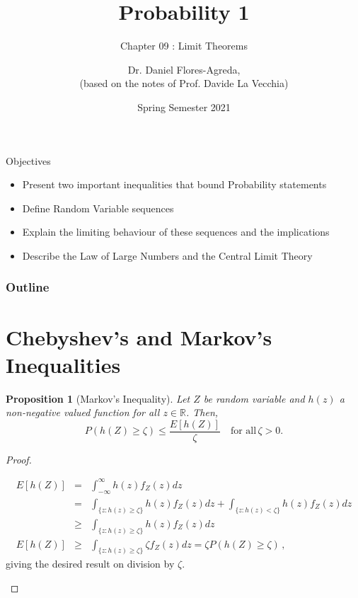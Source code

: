 \documentclass[notes=show,smaller,handout]{beamer}\usepackage[]{graphicx}\usepackage[]{color}
\newtheorem{proposition}{Proposition}[section]
\renewcommand{\Pr}{P}
\begin{document}
\title[S110015]{Probability 1}
\subtitle{Chapter 09 : Limit Theorems}
\author[Flores-Agreda, La Vecchia]{Dr. Daniel Flores-Agreda, \\[0.5em] \tiny{(based on the notes of Prof. Davide La Vecchia)}}
\date{Spring Semester 2021}

\begin{frame}
  \titlepage
\end{frame}


\begin{frame}{Objectives}
  \begin{itemize}
  \item Present two important inequalities that bound Probability statements\bigskip
  \item Define Random Variable sequences \bigskip
  \item Explain the limiting behaviour of these sequences and the implications \bigskip
  \item Describe the Law of Large Numbers and the Central Limit Theory\bigskip
  \end{itemize}
\end{frame}

\begin{frame}{\secname}
  \frametitle{Outline}
  \tableofcontents
\end{frame}


\section{Chebyshev's and Markov's Inequalities}

\begin{frame}{\secname}
  \begin{proposition}[Markov's Inequality]
  Let $Z$ be random variable and $h(z)$ a non-negative valued function for all $z\in \mathbb{R}$. Then,
    \begin{equation}
    \Pr(h(Z)\geq \zeta)\leq \frac{E[h(Z)]}{\zeta}\quad\text{for all}\,\zeta>0. \label{Eq. M1}
    \end{equation}
  \end{proposition}
  \pause
  \begin{proof}
  \begin{footnotesize}
  \begin{eqnarray*}
  E[h( Z)]&=&\int_{-\infty }^{\infty }h(z) f_{Z}\left(z\right)dz\\
  &=&\int_{\{z:h(z)\geq\zeta\}}h(z) f_{Z}\left(z\right) dz+
  \int_{\{z:h(z)<\zeta\}}h(z) f_{Z}\left(z\right) dz \\
  &\geq&\int_{\{z:h(z)\geq\zeta\}}h(z) f_{Z}\left(z\right) dz\\
  E[h( Z)] &\geq&\int_{\{z:h(z)\geq\zeta\}}\zeta f_{Z}\left(z\right)dz=\zeta\Pr(h(Z)\geq\zeta)\,,
  \end{eqnarray*}
  giving the desired result on division by $\zeta$.
  \end{footnotesize}
  \end{proof}
\end{frame}
\end{document}
